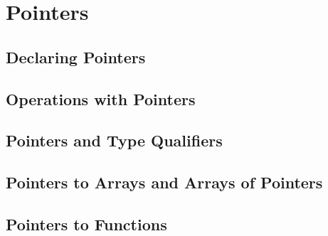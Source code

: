 \section{Pointers}

\subsection{Declaring Pointers}
\subsection{Operations with Pointers}
\subsection{Pointers and Type Qualifiers}
\subsection{Pointers to Arrays and Arrays of Pointers}
\subsection{Pointers to Functions}
